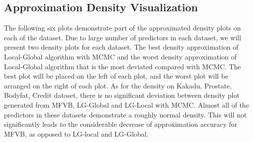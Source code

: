 \subsection{Approximation Density Visualization}
The following six plots demonstrate part of the approximated density plots on each of the dataset. Due to large number of predictors in each dataset, we will present two density plots for each dataset. The best density approximation of Local-Global algorithm with MCMC and the worst density approximation of Local-Global algorithm that is the most deviated compared with MCMC. The best plot will be placed on the left of each plot, and the worst plot will be arranged on the right of each plot.
As for the density on Kakadu, Prostate, Bodyfat, Credit dataset, there is no significant deviation between density plot generated from MFVB, LG-Global and LG-Local with MCMC. Almost all of the predictors in these datasets demonstrate a roughly normal density. This will not significantly leads to the considerable decrease of approximation accuracy for MFVB, as opposed to LG-local and LG-Global.\\
